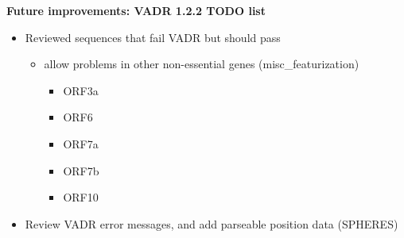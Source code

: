 \documentclass[landscape]{slides}
\begin{document}
%
%
%
\begin{slide}
\begin{center}
\large{\textbf{Future improvements: VADR 1.2.2 TODO list}}

\normalsize
\begin{itemize}
\item Reviewed sequences that fail VADR but should pass
  \begin{itemize}
    \item allow problems in other non-essential genes (misc\_featurization)
      \begin{itemize}
      \item ORF3a
      \item ORF6
      \item ORF7a
      \item ORF7b
      \item ORF10
      \end{itemize}
  \end{itemize}
\item Review VADR error messages, and add parseable position data (SPHERES)
\end{itemize}

\end{center}

\vfill
\end{slide}
\end{document}
